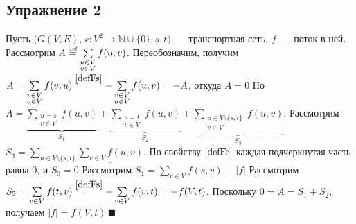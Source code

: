 \documentclass[a4paper]{article}
\def\eqdef{\overset{\mbox{\tiny def}}{=}}
\newcommand{\Nz}{\mathbb{N}\cup\{0\}}
\begin{document}
\subsection*{Упражнение 2}
Пусть $(G(V,E)$, $c\colon V^2\to\Nz, s, t)$~--- транспортная сеть. $f$~--- поток в ней.\newline
Рассмотрим $A\eqdef\sum\limits_{\substack{u\in V\\v\in V}} f(u,v)$. Переобозначим, получим $A=\sum\limits_{\substack{v\in V\\u\in V}}f(v,u)\overset{\ref{defFs}}{=}-\sum\limits_{\substack{v\in V\\u\in V}}f(u,v)=-A$, откуда $A=0$\newline
Но $A=\underbrace{\sum\limits_{\substack{u=s\\v\in V}}f(u,v)}_{S_1}+\underbrace{\sum\limits_{\substack{u=t\\v\in V}}f(u,v)}_{S_2}+\underbrace{\sum\limits_{\substack{u\in V\setminus \{s,t\}\\v\in V}}f(u,v)}_{S_3}$.\newline
Рассмотрим $S_3=\sum\limits_{u\in V\setminus\{s,t\}}\underline{\sum\limits_{v\in V}f(u,v)}$. По свойству $\ref{defFc}$ каждая подчеркнутая часть равна $0$, и $S_3=0$\newline
Рассмотрим $S_1=\sum\limits_{v\in V}f(s,v)\equiv |f|$\newline
Рассмотрим $S_2=\sum\limits_{v\in V}f(t,v)\overset{\ref{defFs}}{=} -\sum\limits_{v\in V}f(v,t)=-f(V,t)$.\newline
Поскольку $0=A=S_1+S_2$, получаем $|f|=f(V,t)\,\blacksquare$
\end{document}

